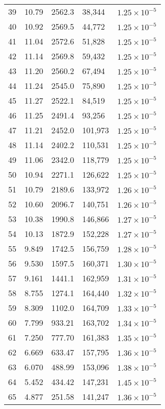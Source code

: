\begin{center}
\begin{table}
\begin{tabular}{lllll}
39 & 10.79 & 2562.3 & 38,344 & $1.25 \times 10^{-5} $\\
40 & 10.92 & 2569.5 & 44,772 & $1.25 \times 10^{-5}$ \\
41 & 11.04 & 2572.6 & 51,828 & $1.25 \times 10^{-5}$ \\
42 & 11.14 & 2569.8 & 59,432 & $1.25 \times 10^{-5} $\\
43 & 11.20 & 2560.2 & 67,494 & $1.25 \times 10^{-5} $\\
44 & 11.24 & 2545.0 & 75,890 & $1.25 \times 10^{-5} $\\
45 & 11.27 & 2522.1 & 84,519 & $1.25 \times 10^{-5} $\\
46 & 11.25 & 2491.4 & 93,256 & $1.25 \times 10^{-5} $\\
47 & 11.21 & 2452.0 & 101,973 & $1.25 \times 10^{-5} $\\
48 & 11.14 & 2402.2 & 110,531 & $1.25 \times 10^{-5} $\\
49 & 11.06 & 2342.0 & 118,779 & $1.25 \times 10^{-5} $\\
    50 & 10.94 & 2271.1 & 126,622 & $1.25 \times 10^{-5}$\\
51 & 10.79 & 2189.6 & 133,972 & $1.26 \times 10^{-5} $\\
52 & 10.60 & 2096.7 & 140,751 & $1.26 \times 10^{-5} $\\
53 & 10.38 & 1990.8 & 146,866 & $1.27 \times 10^{-5} $\\
54 & 10.13 & 1872.9 & 152,228 & $1.27 \times 10^{-5} $\\
55 & 9.849 & 1742.5 & 156,759 & $1.28 \times 10^{-5} $\\
56 & 9.530 & 1597.5 & 160,371 & $1.30 \times 10^{-5} $\\
57 & 9.161 & 1441.1 & 162,959 & $1.31 \times 10^{-5}$ \\
58 & 8.755 & 1274.1 & 164,440 & $1.32 \times 10^{-5} $\\
59 & 8.309 & 1102.0 & 164,709 & $1.33 \times 10^{-5} $\\
60 & 7.799 & 933.21 & 163,702 & $1.34 \times 10^{-5} $\\
61 & 7.250 & 777.70 & 161,383 & $1.35 \times 10^{-5}$ \\
62 & 6.669 & 633.47 & 157,795 &$ 1.36 \times 10^{-5}$ \\
63 & 6.070 & 488.99 & 153,096 & $1.38 \times 10^{-5}$ \\
64 & 5.452 & 434.42 & 147,231 & $1.45 \times 10^{-5}$ \\
65 & 4.877 & 251.58 & 141,247 & $1.36 \times 10^{-5}$ \\
    \hline
  \end{tabular}
  \end{table}
\end{center}

%
